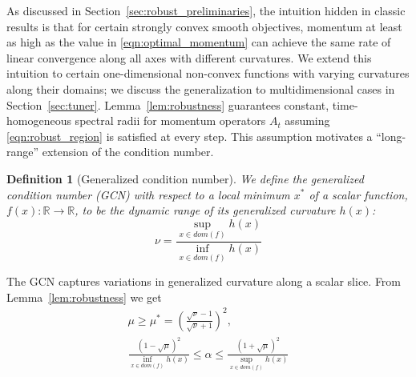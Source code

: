 \documentclass{article}
\newtheorem{definition}[theorem]{Definition}
\newcommand{\mat}[1]{\bm{\mathit{#1}}}
\begin{document}
As discussed in Section~\ref{sec:robust_preliminaries}, the intuition hidden in classic results
is that for certain strongly convex smooth objectives, 
momentum at least as high as
the value in \eqref{eqn:optimal_momentum} can achieve the same rate of linear convergence along all axes with different curvatures. 
We extend this intuition to certain one-dimensional non-convex functions with varying curvatures along their domains; we discuss the generalization to multidimensional cases in Section~\ref{sec:tuner}.
Lemma~\ref{lem:robustness} guarantees constant, time-homogeneous spectral radii for momentum operators $\mat{A}_t$ 
assuming \eqref{eqn:robust_region} is satisfied at every step. 
This assumption motivates a ``long-range'' extension of the condition number.
\begin{definition}[Generalized condition number]
We define the generalized condition number (GCN) with respect to a local minimum $x^*$ of a scalar function, $f(x):\mathbb{R}\rightarrow \mathbb{R}$, to be the dynamic range of its generalized curvature $h(x)$:
\begin{equation}
	\nu = \frac{\sup_{x \in dom(f)} h(x)}{ \inf_{x \in dom(f)} h(x)}
\end{equation}
\label{def:GCN}
\end{definition}
The GCN captures variations in generalized curvature along a scalar slice.
From Lemma~\ref{lem:robustness} we get
\begin{equation}
\begin{gathered}
	\mu \geq \mu^* = \left(\frac{\sqrt{\nu}-1}{\sqrt{\nu}+1}\right)^2, \\
	\frac{(1-\sqrt{\mu})^2}{\inf_{x \in dom(f)}h(x)} \leq \alpha \leq \frac{(1+\sqrt{\mu})^2}{\sup_{x \in dom(f)}h(x)}
	\label{eqn:noiseless_tuning_rule}
\end{gathered}
\end{equation}
\end{document}
